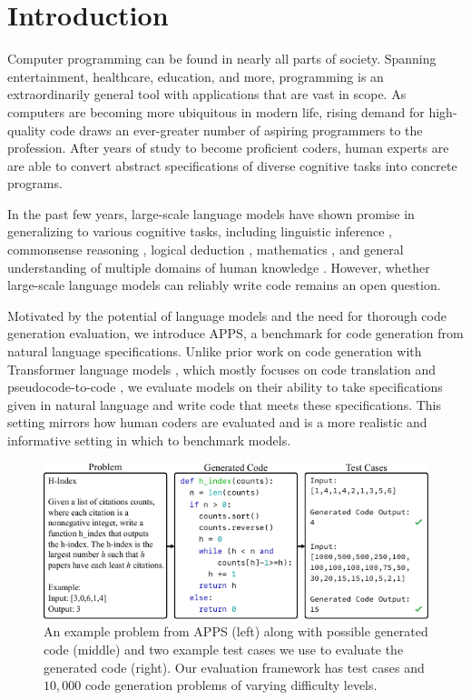 \section{Introduction}
Computer programming can be found in nearly all parts of society. Spanning entertainment, healthcare, education, and more, programming is an extraordinarily general tool with applications that are vast in scope. As computers are becoming more ubiquitous in modern life, rising demand for high-quality code draws an ever-greater number of aspiring programmers to the profession. After years of study to become proficient coders, human experts are are able to convert abstract specifications of diverse cognitive tasks into concrete programs.

In the past few years, large-scale language models have shown promise in generalizing to various cognitive tasks, including linguistic inference \citep{NEURIPS2019_4496bf24}, commonsense reasoning \citep{zellers2019hellaswag,huang2019cosmosqa,bisk2019physicaliqa}, logical deduction \citep{Liu2020LogiQAAC}, mathematics \citep{Polu2020GenerativeLM,hendrycksmath2021}, and general understanding of multiple domains of human knowledge \citep{hendryckstest2021}. However, whether large-scale language models can reliably write code remains an open question. %

Motivated by the potential of language models and the need for thorough code generation evaluation, we introduce APPS, a benchmark for code generation from natural language specifications. Unlike prior work on code generation with Transformer language models \citep{Vaswani2017AttentionIA}, which mostly focuses on code translation \citep{lachaux2020unsupervised} and pseudocode-to-code \citep{NEURIPS2019_7298332f}, we evaluate models on their ability to take specifications given in natural language and write code that meets these specifications. This setting mirrors how human coders are evaluated and is a more realistic and informative setting in which to benchmark models.

\begin{figure}[t]
    \centering
    \includegraphics[width=\textwidth]{figures/splash2.pdf}
    \caption{An example problem from APPS (left) along with possible generated code (middle) and two example test cases we use to evaluate the generated code (right). Our evaluation framework has test cases and $10,\!000$ code generation problems of varying difficulty levels.}
    \label{fig:apps_splash}
\end{figure}

